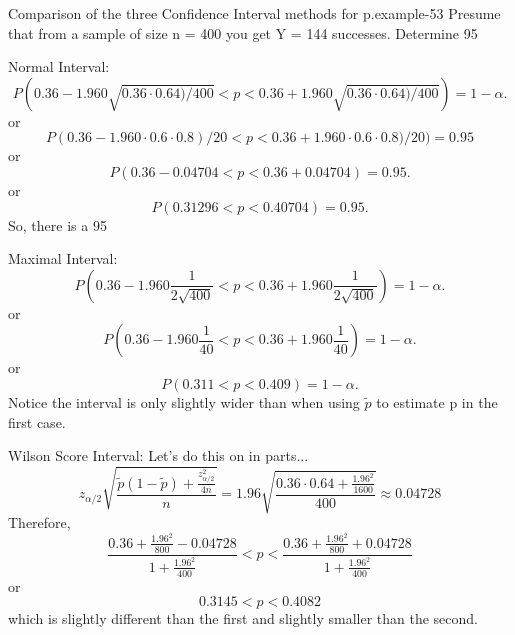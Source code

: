 \documentclass[10pt,]{book}
\numberwithin{equation}{section}
\newcommand{\lt}{<}
\begin{document}
 \begin{example}{Comparison of the three Confidence Interval methods for p.}{example-53}%
\hypertarget{p-1285}{}%
Presume that from a sample of size n = 400 you get Y = 144 successes.  Determine 95%
\par
\hypertarget{p-1286}{}%
Normal Interval:%
\begin{equation*}
P( 0.36 - 1.960 \sqrt{0.36 \cdot 0.64) / 400} \lt  p \lt 0.36 + 1.960 \sqrt{0.36 \cdot 0.64) / 400}) = 1 - \alpha.
\end{equation*}
or%
\begin{equation*}
P( 0.36 - 1.960 \cdot 0.6 \cdot 0.8) / 20 \lt  p \lt 0.36 + 1.960 \cdot 0.6 \cdot 0.8) / 20) = 0.95 
\end{equation*}
or%
\begin{equation*}
P( 0.36 - 0.04704 \lt  p \lt 0.36 + 0.04704) = 0.95 .
\end{equation*}
or%
\begin{equation*}
P( 0.31296 \lt  p \lt 0.40704) = 0.95 .
\end{equation*}
So, there is a 95%
\par
\hypertarget{p-1287}{}%
Maximal Interval:%
\begin{equation*}
P( 0.36 - 1.960 \frac{1}{2\sqrt{400}} \lt  p \lt 0.36 + 1.960 \frac{1}{2\sqrt{400}} ) = 1 - \alpha.
\end{equation*}
or%
\begin{equation*}
P( 0.36 - 1.960 \frac{1}{40} \lt  p \lt 0.36 + 1.960 \frac{1}{40} ) = 1 - \alpha.
\end{equation*}
or%
\begin{equation*}
P( 0.311 \lt  p \lt 0.409 ) = 1 - \alpha.
\end{equation*}
Notice the interval is only slightly wider than when using \(\tilde{p}\) to estimate p in the first case.%
\par
\hypertarget{p-1288}{}%
Wilson Score Interval:  Let's do this on in parts...%
\begin{equation*}
z_{\alpha/2} \sqrt{\frac{\tilde{p}(1-\tilde{p}) + \frac{z_{\alpha/2}^2}{4n}}{n}} = 1.96 \sqrt{ \frac{0.36 \cdot 0.64 + \frac{1.96^2}{1600}}{400}} \approx 0.04728
\end{equation*}
Therefore,%
\begin{equation*}
\frac{0.36 + \frac{1.96^2}{800} - 0.04728}{1 + \frac{1.96^2}{400}} \lt p \lt \frac{0.36 + \frac{1.96^2}{800} + 0.04728}{1 + \frac{1.96^2}{400}}
\end{equation*}
or%
\begin{equation*}
0.3145 \lt p \lt 0.4082
\end{equation*}
which is slightly different than the first and slightly smaller than the second.%
\end{example}
\end{document}
